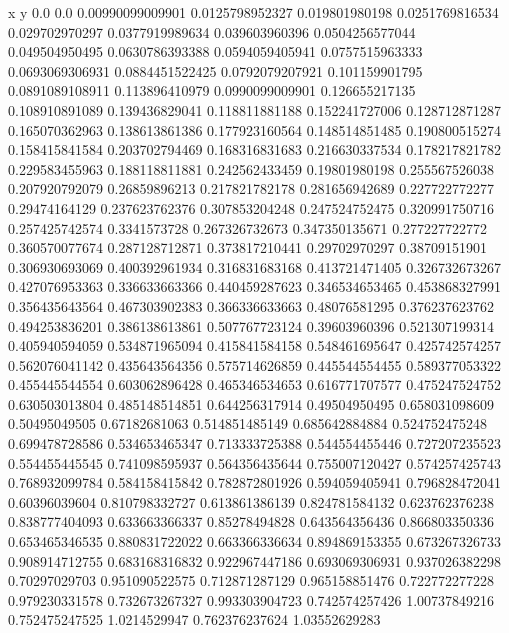               x                y
            0.0              0.0
0.00990099009901  0.0125798952327
 0.019801980198  0.0251769816534
 0.029702970297  0.0377919989634
 0.039603960396  0.0504256577044
 0.049504950495  0.0630786393388
0.0594059405941  0.0757515963333
0.0693069306931  0.0884451522425
0.0792079207921   0.101159901795
0.0891089108911   0.113896410979
0.0990099009901   0.126655217135
 0.108910891089   0.139436829041
 0.118811881188   0.152241727006
 0.128712871287   0.165070362963
 0.138613861386   0.177923160564
 0.148514851485   0.190800515274
 0.158415841584   0.203702794469
 0.168316831683   0.216630337534
 0.178217821782   0.229583455963
 0.188118811881   0.242562433459
  0.19801980198   0.255567526038
 0.207920792079    0.26859896213
 0.217821782178   0.281656942689
 0.227722772277    0.29474164129
 0.237623762376   0.307853204248
 0.247524752475   0.320991750716
 0.257425742574     0.3341573728
 0.267326732673   0.347350135671
 0.277227722772   0.360570077674
 0.287128712871   0.373817210441
  0.29702970297    0.38709151901
 0.306930693069   0.400392961934
 0.316831683168   0.413721471405
 0.326732673267   0.427076953363
 0.336633663366   0.440459287623
 0.346534653465   0.453868327991
 0.356435643564   0.467303902383
 0.366336633663    0.48076581295
 0.376237623762   0.494253836201
 0.386138613861   0.507767723124
  0.39603960396   0.521307199314
 0.405940594059   0.534871965094
 0.415841584158   0.548461695647
 0.425742574257   0.562076041142
 0.435643564356   0.575714626859
 0.445544554455   0.589377053322
 0.455445544554   0.603062896428
 0.465346534653   0.616771707577
 0.475247524752   0.630503013804
 0.485148514851   0.644256317914
  0.49504950495   0.658031098609
  0.50495049505    0.67182681063
 0.514851485149   0.685642884884
 0.524752475248   0.699478728586
 0.534653465347   0.713333725388
 0.544554455446   0.727207235523
 0.554455445545   0.741098595937
 0.564356435644   0.755007120427
 0.574257425743   0.768932099784
 0.584158415842   0.782872801926
 0.594059405941   0.796828472041
  0.60396039604   0.810798332727
 0.613861386139   0.824781584132
 0.623762376238   0.838777404093
 0.633663366337    0.85278494828
 0.643564356436   0.866803350336
 0.653465346535   0.880831722022
 0.663366336634   0.894869153355
 0.673267326733   0.908914712755
 0.683168316832   0.922967447186
 0.693069306931   0.937026382298
  0.70297029703   0.951090522575
 0.712871287129   0.965158851476
 0.722772277228   0.979230331578
 0.732673267327   0.993303904723
 0.742574257426    1.00737849216
 0.752475247525     1.0214529947
 0.762376237624    1.03552629283
